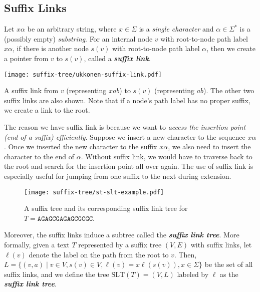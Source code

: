 \subsection{Suffix Links}

\begin{definition} 
    \normalfont
    Let $x\alpha$ be an arbitrary string, where $x \in \Sigma$ is a \textit{single character} and $\alpha \in \Sigma^*$ is a (possibly empty) \textit{substring}. For an internal node $v$ with root-to-node path label $x \alpha$, if there is another node $s(v)$ with root-to-node path label $\alpha$, then we create a pointer from $v$ to $s(v)$, called a \textit{\textbf{suffix link}}.
    \begin{marginfigure}
        \centering
        \texttt{[image: suffix-tree/ukkonen-suffix-link.pdf]}
        \caption{A suffix link from $v$ (representing $xab$) to $s(v)$ (representing $ab$). The other two suffix links are also shown. Note that if a node's path label has no proper suffix, we create a link to the root.}
    \end{marginfigure}
\end{definition}

The reason we have suffix link is because we want to \textit{access the insertion point (end of a suffix) efficiently}. Suppose we insert a new character to the sequence $x\alpha$. Once we inserted the new character to the suffix $x \alpha$, we also need to insert the character to the end of $\alpha$. Without suffix link, we would have to traverse back to the root and search for the insertion point all over again. The use of suffix link is especially useful for jumping from one suffix to the next during extension.

\begin{figure}
    \centering
    \texttt{[image: suffix-tree/st-slt-example.pdf]}
    \caption{A suffix tree and its corresponding suffix link tree for $T = \texttt{AGAGCGAGAGCGCGC}$. }
\end{figure}

Moreover, the suffix links induce a subtree called the \textit{\textbf{suffix link tree}}. More formally, given a text $T$ represented by a suffix tree $(V,E)$ with suffix links, let $\ell(v)$ denote the label on the path from the root to $v$. Then, $L = \{(v,a) \mid v \in V, s(v) \in V, \ell(v) = x \ell(s(v)), x \in \Sigma\}$ be the set of all suffix links, and we define the tree $\text{SLT}(T) = (V,L)$ labeled by $\ell$ as the \textit{\textbf{suffix link tree}}.

